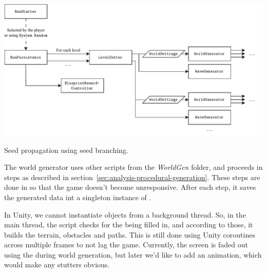 \begin{center}
    \captionsetup{type=figure}
    \includegraphics[width=\textwidth]{img/seed splitting.pdf}
    \caption{Seed propagation using seed branching.}
    \label{fig:seed-branching}
\end{center}

The world generator uses other scripts from the \emph{WorldGen} folder, and proceeds in steps as described in section~\ref{sec:analysis-procedural-generation}.
These steps are done in so that the game doesn't become unresponsive.
After each step, it saves the generated data int a singleton instance of .

In Unity, we cannot instantiate objects from a background thread.
So, in the main thread, the script  checks for the  being filled in, and according to those, it builds the terrain, obstacles and paths.
This is still done using Unity coroutines across multiple frames to not lag the game.
Currently, the screen is faded out using the  during world generation, but later we'd like to add an animation, which would make any stutters obvious.
